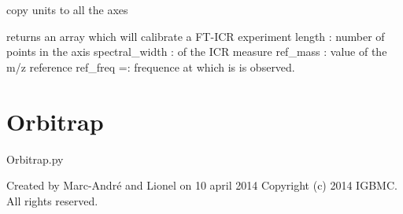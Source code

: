 \documentclass[letterpaper,10pt,openany,oneside]{sphinxmanual}
\begin{document}
\begin{fulllineitems}
\begin{fulllineitems}
\end{fulllineitems}


\begin{fulllineitems}
\label{rst/code:FTICR.FTICRData.units}
copy units to all the axes

\end{fulllineitems}


\end{fulllineitems}


\begin{fulllineitems}
\label{rst/code:FTICR.fticr_mass_axis}
returns an array which will calibrate a FT-ICR experiment
length : number of points in the axis
spectral\_width : of the ICR measure
ref\_mass : value of the m/z reference
ref\_freq =: frequence at which is is observed.

\end{fulllineitems}



\section{Orbitrap}
\label{rst/code:orbitrap}\label{rst/code:module-Orbitrap}
Orbitrap.py

Created by Marc-André and Lionel on 10 april 2014
Copyright (c) 2014 IGBMC. All rights reserved.
\end{document}
